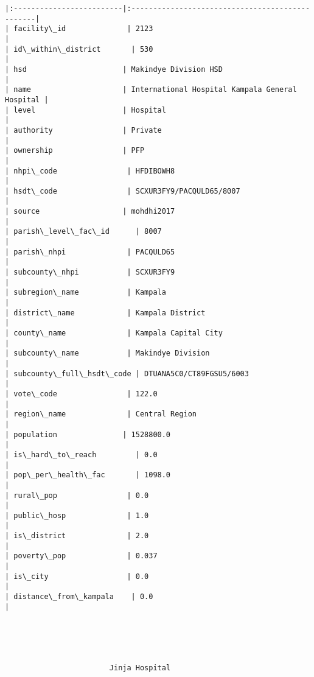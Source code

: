 \documentclass[11pt]{article}
\begin{document}
\begin{Verbatim}[commandchars=\\\{\}]
|:-------------------------|:------------------------------------------------|
| facility\_id              | 2123                                            |
| id\_within\_district       | 530                                             |
| hsd                      | Makindye Division HSD                           |
| name                     | International Hospital Kampala General Hospital |
| level                    | Hospital                                        |
| authority                | Private                                         |
| ownership                | PFP                                             |
| nhpi\_code                | HFDIBOWH8                                       |
| hsdt\_code                | SCXUR3FY9/PACQULD65/8007                        |
| source                   | mohdhi2017                                      |
| parish\_level\_fac\_id      | 8007                                            |
| parish\_nhpi              | PACQULD65                                       |
| subcounty\_nhpi           | SCXUR3FY9                                       |
| subregion\_name           | Kampala                                         |
| district\_name            | Kampala District                                |
| county\_name              | Kampala Capital City                            |
| subcounty\_name           | Makindye Division                               |
| subcounty\_full\_hsdt\_code | DTUANA5C0/CT89FGSU5/6003                        |
| vote\_code                | 122.0                                           |
| region\_name              | Central Region                                  |
| population               | 1528800.0                                       |
| is\_hard\_to\_reach         | 0.0                                             |
| pop\_per\_health\_fac       | 1098.0                                          |
| rural\_pop                | 0.0                                             |
| public\_hosp              | 1.0                                             |
| is\_district              | 2.0                                             |
| poverty\_pop              | 0.037                                           |
| is\_city                  | 0.0                                             |
| distance\_from\_kampala    | 0.0                                             |





                        Jinja Hospital                         


\end{Verbatim}
\end{document}
